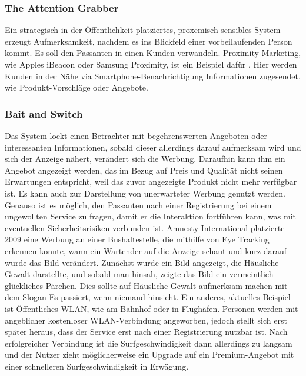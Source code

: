 \documentclass[a4paper]{article}
\begin{document}
\subsubsection{The Attention Grabber}
\label{sssec:the_attention_grabber}
Ein strategisch in der Öffentlichkeit platziertes, proxemisch-sensibles System erzeugt Aufmerksamkeit, nachdem es ins Blickfeld einer vorbeilaufenden Person kommt. Es soll den Passanten in einen Kunden verwandeln.\newline
Proximity Marketing, wie Apples iBeacon oder Samsung Proximity, ist ein Beispiel dafür \cite{proximity_marketing} \cite{proximity_marketing2}. Hier werden Kunden in der Nähe via Smartphone-Benachrichtigung Informationen zugesendet, wie Produkt-Vorschläge oder Angebote.

\subsubsection{Bait and Switch}
\label{sssec:bait_and_switch2}
Das System lockt einen Betrachter mit begehrenswerten Angeboten oder interessanten Informationen, sobald dieser allerdings darauf aufmerksam wird und sich der Anzeige nähert, verändert sich die Werbung. Daraufhin kann ihm ein Angebot angezeigt werden, das im Bezug auf Preis und Qualität nicht seinen Erwartungen entspricht, weil das zuvor angezeigte Produkt nicht mehr verfügbar ist. Es kann auch zur Darstellung von unerwarteter Werbung genutzt werden. Genauso ist es möglich, den Passanten nach einer Registrierung bei einem ungewollten Service zu fragen, damit er die Interaktion fortführen kann, was mit eventuellen Sicherheitsrisiken verbunden ist.\newline
Amnesty International platzierte 2009 eine Werbung an einer Bushaltestelle, die mithilfe von Eye Tracking erkennen konnte, wann ein Wartender auf die Anzeige schaut und kurz darauf wurde das Bild verändert. Zunächst wurde ein Bild angezeigt, die Häusliche Gewalt darstellte, und sobald man hinsah, zeigte das Bild ein vermeintlich glückliches Pärchen. Dies sollte auf Häusliche Gewalt aufmerksam machen mit dem Slogan \glqq Es passiert, wenn niemand hinsieht.\grqq{} \cite{amnesty_international}
Ein anderes, aktuelles Beispiel ist Öffentliches WLAN, wie am Bahnhof oder in Flughäfen. Personen werden mit angeblicher kostenloser WLAN-Verbindung angeworben, jedoch stellt sich erst später heraus, dass der Service erst nach einer Registrierung nutzbar ist. Nach erfolgreicher Verbindung ist die Surfgeschwindigkeit dann allerdings zu langsam und der Nutzer zieht möglicherweise ein Upgrade auf ein Premium-Angebot mit einer schnelleren Surfgeschwindigkeit in Erwägung.
\end{document}
